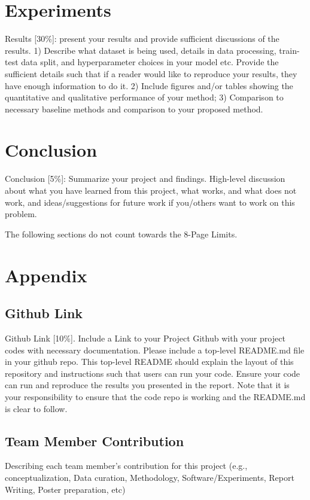 \documentclass{article}
\newcommand{\instructions}[1]{{\color{blue} #1}}
\begin{document}
\section{Experiments}
\instructions{Results [30\%]: present your results and provide sufficient discussions of the results. 1) Describe what dataset is being used, details in data processing, train-test data split, and hyperparameter choices in your model etc. Provide the sufficient details such that if a reader would like to reproduce your results, they have enough information to do it. 2) Include figures and/or tables showing the quantitative and qualitative performance of your method; 3) Comparison to necessary baseline methods and comparison to your proposed method.} 

\section{Conclusion}
\instructions{Conclusion [5\%]: Summarize your project and findings. High-level discussion about what you have learned from this project, what works, and what does not work, and ideas/suggestions for future work if you/others want to work on this problem.}

\newpage
\instructions{The following sections do not count towards the 8-Page Limits.}
\section*{Appendix}
\subsection*{Github Link}
\instructions{Github Link [10\%]. Include a Link to your Project Github with your project codes with necessary documentation. Please include a top-level README.md file in your github repo. This top-level README should explain the layout of this repository and instructions such that users can run your code. Ensure your code can run and reproduce the results you presented in the report. Note that it is your responsibility to ensure that the code repo is working and the README.md is clear to follow.}

\subsection*{Team Member Contribution}
\instructions{Describing each team member's contribution for this project (e.g., conceptualization, Data curation, Methodology, Software/Experiments, Report Writing, Poster preparation, etc)} 



\end{document}

